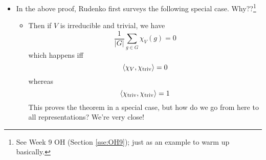 \documentclass[../notes.tex]{subfiles}
\begin{document}
\begin{itemize}
\begin{proof}
        We will work towards a formula for the inner product, using various results that we've proven up until now. Let's begin.
        \begin{align*}
            \inp{\chi_V,\chi_W} &= \frac{1}{|G|}\sum_{g\in G}\chi_V(g)\cdot\overline{\chi_W(g)}\tag*{Definition}\\
            &= \frac{1}{|G|}\sum_{g\in G}\chi_V(g)\cdot\chi_{W^*}(g)\tag*{Property 4}\\
            &= \frac{1}{|G|}\sum_{g\in G}\chi_{V\otimes W^*}(g)\tag*{Property 5}\\
            &= \dim[(V\otimes W^*)^G]\tag*{Lemma 3}\\
            &= \dim([\Hom_F(V,W)]^G)\tag*{Lecture 2.1}\\
            &= \dim[\Hom_G(V,W)]\tag*{PSet 2, Q4b}\\
            &=
            \begin{cases}
                \dim(\spn(0)) & V\ncong W\\
                \dim(\spn(I)) & V\cong W
            \end{cases}
            \tag*{Schur's Lemma}\\
            &=
            \begin{cases}
                0 & V\ncong W\\
                1 & V\cong W
            \end{cases}
        \end{align*}
    \end{proof}
    \item In the above proof, Rudenko first surveys the following special case. Why??\footnote{See Week 9 OH (Section \ref{sse:OH9}); just as an example to warm up basically.}
    \begin{itemize}
        \item Then if $V$ is irreducible and trivial, we have
        \begin{equation*}
            \frac{1}{|G|}\sum_{g\in G}\chi_V(g) = 0
        \end{equation*}
        which happens iff
        \begin{equation*}
            \left\langle{\chi_V,\chi_\text{triv}}\right\rangle = 0
        \end{equation*}
        whereas
        \begin{equation*}
            \left\langle{\chi_\text{triv},\chi_\text{triv}}\right\rangle = 1
        \end{equation*}
        This proves the theorem in a special case, but how do we go from here to all representations? We're very close!

\end{itemize}
\end{itemize}
\end{document}
